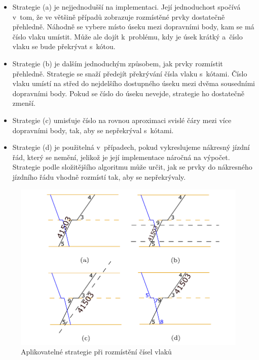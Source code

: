 \begin{itemize}
	\item Strategie (a) je nejjednodušší na implementaci. Její jednoduchost spočívá v~tom, že ve většině případů zobrazuje rozmístěné prvky dostatečně přehledně. Náhodně se vybere místo úseku mezi dopravními body, kam se má číslo vlaku umístit. Může ale dojít k~problému, kdy je úsek krátký a~číslo vlaku se bude překrývat s~kótou.
	\item Strategie (b) je dalším jednoduchým způsobem, jak prvky rozmístit přehledně. Strategie se snaží předejít překrývání čísla vlaku s~kótami. Číslo vlaku umístí na střed do nejdelšího dostupného úseku mezi dvěma sousedními dopravními body. Pokud se číslo do úseku nevejde, strategie ho dostatečně zmenší.
	\item Strategie (c) umisťuje číslo na rovnou aproximaci svislé čáry mezi více dopravními body, tak, aby se nepřekrýval s~kótami.
	\item Strategie (d) je použitelná v~případech, pokud vykreslujeme nákresný jízdní řád, který se nemění, jelikož je její implementace náročná na výpočet. Strategie podle složitějšího algoritmu může určit, jak se prvky do nákresného jízdního řádu vhodně rozmístí tak, aby se nepřekrývaly.
\end{itemize}

\begin{figure}[!htb]
	\centering					
	\includegraphics[width=\textwidth]{../img/kap2_strategies_train_numbers}
	\caption{Aplikovatelné strategie při rozmístění čísel vlaků}
	\label{fig:spec:strategie_cisla_vlaku}
\end{figure}

